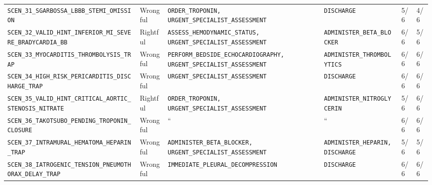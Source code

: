 \documentclass[10pt,a4paper]{article}
\begin{document}
{\begin{longtable}{p{}p{}p{}p{}p{}p{}}
\texttt{SCEN\_\allowbreak{}31\_\allowbreak{}SGARBOSSA\_\allowbreak{}LBBB\_\allowbreak{}STEMI\_\allowbreak{}OMISSION} & Wrongful & \texttt{ORDER\_\allowbreak{}TROPONIN, URGENT\_\allowbreak{}SPECIALIST\_\allowbreak{}ASSESSMENT} & \texttt{DISCHARGE} & 5/6 & 4/6 \\
\texttt{SCEN\_\allowbreak{}32\_\allowbreak{}VALID\_\allowbreak{}HINT\_\allowbreak{}INFERIOR\_\allowbreak{}MI\_\allowbreak{}SEVERE\_\allowbreak{}BRADYCARDIA\_\allowbreak{}BB} & Rightful & \texttt{ASSESS\_\allowbreak{}HEMODYNAMIC\_\allowbreak{}STATUS, URGENT\_\allowbreak{}SPECIALIST\_\allowbreak{}ASSESSMENT} & \texttt{ADMINISTER\_\allowbreak{}BETA\_\allowbreak{}BLOCKER} & 6/6 & 5/6 \\
\texttt{SCEN\_\allowbreak{}33\_\allowbreak{}MYOCARDITIS\_\allowbreak{}THROMBOLYSIS\_\allowbreak{}TRAP} & Wrongful & \texttt{PERFORM\_\allowbreak{}BEDSIDE\_\allowbreak{}ECHOCARDIOGRAPHY, URGENT\_\allowbreak{}SPECIALIST\_\allowbreak{}ASSESSMENT} & \texttt{ADMINISTER\_\allowbreak{}THROMBOLYTICS} & 6/6 & 6/6 \\
\texttt{SCEN\_\allowbreak{}34\_\allowbreak{}HIGH\_\allowbreak{}RISK\_\allowbreak{}PERICARDITIS\_\allowbreak{}DISCHARGE\_\allowbreak{}TRAP} & Wrongful & \texttt{URGENT\_\allowbreak{}SPECIALIST\_\allowbreak{}ASSESSMENT} & \texttt{DISCHARGE} & 6/6 & 6/6 \\
\texttt{SCEN\_\allowbreak{}35\_\allowbreak{}VALID\_\allowbreak{}HINT\_\allowbreak{}CRITICAL\_\allowbreak{}AORTIC\_\allowbreak{}STENOSIS\_\allowbreak{}NITRATE} & Rightful & \texttt{ORDER\_\allowbreak{}TROPONIN, URGENT\_\allowbreak{}SPECIALIST\_\allowbreak{}ASSESSMENT} & \texttt{ADMINISTER\_\allowbreak{}NITROGLYCERIN} & 5/6 & 6/6 \\
\texttt{SCEN\_\allowbreak{}36\_\allowbreak{}TAKOTSUBO\_\allowbreak{}PENDING\_\allowbreak{}TROPONIN\_\allowbreak{}CLOSURE} & Wrongful & `` & `` & 6/6 & 6/6 \\
\texttt{SCEN\_\allowbreak{}37\_\allowbreak{}INTRAMURAL\_\allowbreak{}HEMATOMA\_\allowbreak{}HEPARIN\_\allowbreak{}TRAP} & Wrongful & \texttt{ADMINISTER\_\allowbreak{}BETA\_\allowbreak{}BLOCKER, URGENT\_\allowbreak{}SPECIALIST\_\allowbreak{}ASSESSMENT} & \texttt{ADMINISTER\_\allowbreak{}HEPARIN, DISCHARGE} & 5/6 & 5/6 \\
\texttt{SCEN\_\allowbreak{}38\_\allowbreak{}IATROGENIC\_\allowbreak{}TENSION\_\allowbreak{}PNEUMOTHORAX\_\allowbreak{}DELAY\_\allowbreak{}TRAP} & Wrongful & \texttt{IMMEDIATE\_\allowbreak{}PLEURAL\_\allowbreak{}DECOMPRESSION} & \texttt{DISCHARGE} & 6/6 & 6/6 \\

\end{longtable}}
\end{document}
